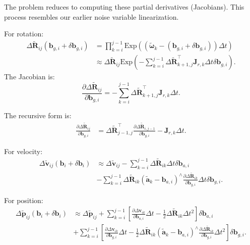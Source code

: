 The problem reduces to computing these partial derivatives (Jacobians). This process resembles our earlier noise variable linearization.

For rotation:
\begin{equation}\label{key}
	\begin{aligned}
		\Delta \tilde{\bm{R}}_{ij} (\bm{b}_{g,i} + \delta \bm{b}_{g,i}) &= \prod_{k=i}^{j-1} \mathrm{Exp} 
		\left((\tilde{\boldsymbol{\omega}}_k - (\bm{b}_{g,i} + \delta \bm{b}_{g,i})) \Delta t \right) \\
		&\approx \Delta \tilde{\bm{R}}_{ij} \mathrm{Exp} \left( -\sum_{k=i}^{j-1} \Delta 
		\tilde{\bm{R}}_{k+1, j}^\top \bm{J}_{r,k} \Delta t \delta \bm{b}_{g,i}  \right).
	\end{aligned}
\end{equation}
The Jacobian is:
\begin{equation}\label{key}
	\frac{\partial \Delta \tilde{\bm{R}}_{ij}}{\partial \bm{b}_{g,i}} = -\sum_{k=i}^{j-1} \Delta 
	\tilde{\bm{R}}_{k+1, j}^\top \bm{J}_{r,k} \Delta t.
\end{equation}

The recursive form is:
\begin{equation}\label{key}
	\begin{aligned}
		\frac{\partial \Delta \tilde{\bm{R}}_{ij}}{\partial \bm{b}_{g,i}} &= \Delta \tilde{\bm{R}}_{j-1, 
			j}^\top \frac{\partial \Delta \tilde{\bm{R}}_{i,j-1}}{\partial \bm{b}_{g,i}} - \bm{J}_{r,k} \Delta 
		t.
	\end{aligned}
\end{equation}

For velocity:
\begin{equation}\label{key}
	\begin{aligned}
		\Delta \tilde{\bm{v}}_{ij}(\bm{b}_i + \delta \bm{b}_i) &\approx \Delta \tilde{\bm{v}}_{ij} - \sum_{k=i}^{j-1} \Delta \tilde{\bm{R}}_{ik} \Delta t \delta 
		\bm{b}_{a,i} \\
		&- \sum_{k=i}^{j-1} \Delta \tilde{\bm{R}}_{ik} (\tilde{\bm{a}}_k - \bm{b}_{a,i})^\wedge 
		\frac{\partial \Delta \tilde{\bm{R}}_{ik}}{\partial \bm{b}_{g,i}} \Delta t \delta \bm{b}_{g,i}.
	\end{aligned}
\end{equation}

For position:
\begin{equation}
	\begin{aligned}
		\Delta \tilde{\bm{p}}_{ij}(\bm{b}_i + \delta \bm{b}_i) &\approx \Delta \tilde{\bm{p}}_{ij} + \sum_{k=i}^{j-1}\left[\frac{\partial \Delta \bm{v}_{ik}}{\partial 
			\bm{b}_{a,i}}  \Delta t - \frac{1}{2} \Delta \tilde{\bm{R}}_{ik} \Delta t^2 \right] \delta \bm{b}_{a,i} \\
		&+ \sum_{k=i}^{j-1} \left[\frac{\partial \Delta \bm{v}_{ik}}{\partial \bm{b}_{g,i}} 
		\Delta t -\frac{1}{2} \Delta \tilde{\bm{R}}_{ik}\left(\tilde{\bm{a}}_{k}-\bm{b}_{a,i}\right)^\wedge  
		\frac{\partial \Delta \tilde{\bm{R}}_{ik}}{\partial \bm{b}_{g,i}} \Delta t^2 \right] \delta \bm{b}_{g,i}.
	\end{aligned}
\end{equation}

